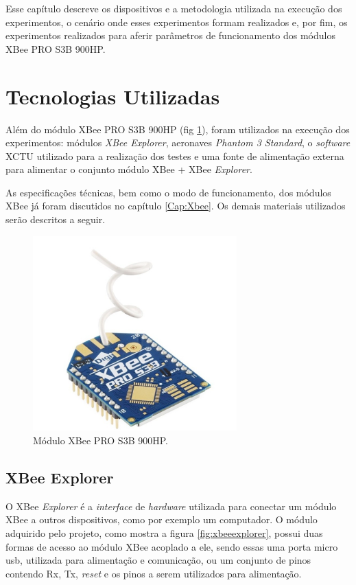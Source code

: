 \label{Cap:Procedimento}

Esse capítulo descreve os dispositivos e a metodologia utilizada na execução dos experimentos, o cenário onde esses experimentos formam realizados e, por fim, os experimentos realizados para aferir parâmetros de funcionamento dos módulos XBee PRO S3B 900HP.

\section{Tecnologias Utilizadas}

Além do módulo XBee PRO S3B 900HP (fig \ref{fig:xbeepro}), foram utilizados na execução dos experimentos: módulos \emph{XBee Explorer}, aeronaves \emph{Phantom 3 Standard}, o \emph{software} XCTU utilizado para a realização dos testes e uma fonte de alimentação externa para alimentar o conjunto módulo XBee + XBee \emph{Explorer}.

As especificações técnicas, bem como o modo de funcionamento, dos módulos XBee já foram discutidos no capítulo \ref{Cap:Xbee}. Os demais materiais utilizados serão descritos a seguir.

\begin{figure}[h!] 
\center
\includegraphics[width=0.7\textwidth]{xbeepro.png}
\caption{Módulo XBee PRO S3B 900HP.} 
\label{fig:xbeepro}
\end{figure}

\subsection{XBee Explorer}

O XBee \emph{Explorer} é a \emph{interface} de \emph{hardware} utilizada para conectar um módulo XBee a outros dispositivos, como por exemplo um computador. O módulo adquirido pelo projeto, como mostra a figura \ref{fig:xbeeexplorer}, possui duas formas de acesso ao módulo XBee acoplado a ele, sendo essas uma porta micro usb, utilizada para alimentação e comunicação, ou um conjunto de pinos contendo Rx, Tx, \emph{reset} e os pinos a serem utilizados para alimentação.

